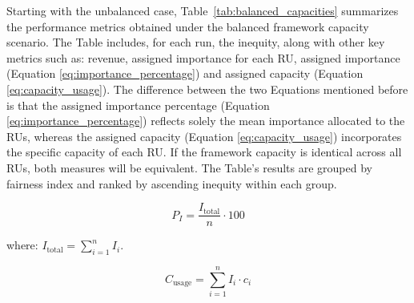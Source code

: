 \documentclass[preprint,12pt]{elsarticle}
\begin{document}
Starting with the unbalanced case, Table~\ref{tab:balanced_capacities} summarizes the performance metrics obtained under the balanced framework capacity scenario. The Table includes, for each run, the inequity, along with other key metrics such as: revenue, assigned importance for each RU, assigned importance (Equation \ref{eq:importance_percentage}) and assigned capacity (Equation \ref{eq:capacity_usage}). The difference between the two Equations mentioned before is that the assigned importance percentage (Equation \ref{eq:importance_percentage}) reflects solely the mean importance allocated to the RUs, whereas the assigned capacity (Equation \ref{eq:capacity_usage}) incorporates the specific capacity of each RU. If the framework capacity is identical across all RUs, both measures will be equivalent. The Table's results are grouped by fairness index and ranked by ascending inequity within each group.

\begin{equation}
P_I = \frac{I_{\text{total}}}{n} \cdot 100
\label{eq:importance_percentage}
\end{equation}

where: $ I_{\text{total}} = \sum_{i=1}^{n}{I_i}$.

\begin{equation}
C_{\text{usage}} = \sum_{i=1}^{n} I_i \cdot c_i
\label{eq:capacity_usage}
\end{equation}
\end{document}
